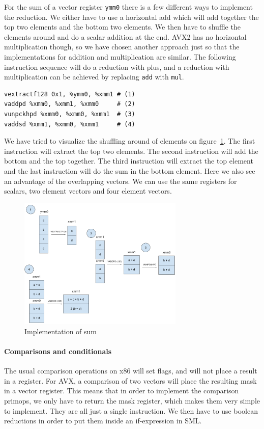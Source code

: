 \documentclass{article}
\begin{document}
For the sum of a vector register \verb!ymm0! there is a few different ways to implement the reduction. We either have to use a horizontal add which will add together the top two elements and the bottom two elements. We then have to shuffle the elements around and do a scalar addition at the end. AVX2 has no horizontal multiplication though, so we have chosen another approach just so that the implementations for addition and multiplication are similar. The following instruction sequence will do a reduction with plus, and a reduction with multiplication can be achieved by replacing \verb!add! with \verb!mul!.
\begin{verbatim}
vextractf128 0x1, %ymm0, %xmm1 # (1)
vaddpd %xmm0, %xmm1, %xmm0     # (2)
vunpckhpd %xmm0, %xmm0, %xmm1  # (3)
vaddsd %xmm1, %xmm0, %xmm1     # (4)
\end{verbatim}
We have tried to visualize the shuffling around of elements on figure~\ref{fig:hadd}. The first instruction will extract the top two elements. The second instruction will add the bottom and the top together. The third instruction will extract the top element and the last instruction will do the sum in the bottom element. Here we also see an advantage of the overlapping vectors. We can use the same registers for scalars, two element vectors and four element vectors.
\begin{figure}
    \centering
    \caption{Implementation of sum}
    \label{fig:hadd}
    \includegraphics[width=0.7\textwidth]{sum.png}
\end{figure}

\paragraph{Comparisons and conditionals}
The usual comparison operations on x86 will set flags, and will not place a result in a register. For AVX, a comparison of two vectors will place the resulting mask in a vector register. This means that in order to implement the comparison primops, we only have to return the mask register, which makes them very simple to implement. They are all just a single instruction. We then have to use boolean reductions in order to put them inside an if-expression in SML.
\end{document}
